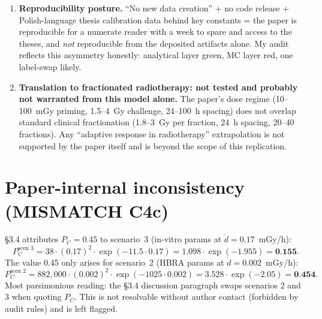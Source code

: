 \documentclass[11pt]{article}
\begin{document}
\begin{enumerate}
    uses two parameter sets: HBRA (in-vivo human background high-radiation area) and
    in-vitro human lymphocyte X-ray fits. It does not test other cell lines
    (V79, CHO, TK6, primary fibroblasts, tumor lines) or other radiation qualities
    (protons, heavy ions, low-dose-rate $\gamma$, high-LET). The MISMATCH at claim C4c
    is a further symptom of underspecification: without the raw calibration data behind
    $\mu_0, \mu_1$ it is not possible to check whether the parameter numbers in
    \S3.4's bullet list are the ones actually used to generate Figs.~7--10.
    \item \textbf{Reproducibility posture.} ``No new data creation'' + no code release
    + Polish-language thesis calibration data behind key constants = the paper is
    reproducible for a numerate reader with a week to spare and access to the
    theses, and \emph{not} reproducible from the deposited artifacts alone. My audit
    reflects this asymmetry honestly: analytical layer green, MC layer red, one
    label-swap likely.
    \item \textbf{Translation to fractionated radiotherapy: not tested and probably not
    warranted from this model alone.} The paper's dose regime (10--100~mGy priming,
    1.5--4~Gy challenge, 24--100~h spacing) does not overlap standard clinical
    fractionation (1.8--3~Gy per fraction, 24~h spacing, 20--40 fractions). Any
    ``adaptive response in radiotherapy'' extrapolation is not supported by the paper
    itself and is beyond the scope of this replication.
\end{enumerate}

\section{Paper-internal inconsistency (MISMATCH C4c)}
\label{sec:mismatch}
\S3.4 attributes $P_C=0.45$ to scenario~3 (in-vitro params at $\dot{d}=0.17$~mGy/h):
\[
P_C^{\text{scen 3}} = 38 \cdot (0.17)^2 \cdot \exp(-11.5\cdot 0.17)
= 1.098 \cdot \exp(-1.955) = \textbf{0.155}.
\]
The value 0.45 only arises for scenario~2 (HBRA params at $\dot{d}=0.002$~mGy/h):
\[
P_C^{\text{scen 2}} = 882{,}000\cdot(0.002)^2\cdot\exp(-1025\cdot 0.002)
= 3.528\cdot\exp(-2.05) = \textbf{0.454}.
\]
Most parsimonious reading: the \S3.4 discussion paragraph swaps scenarios 2 and 3
when quoting $P_C$. This is not resolvable without author contact (forbidden by
audit rules) and is left flagged.
\end{document}
